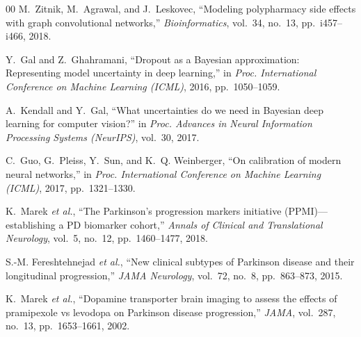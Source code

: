 \documentclass[journal,twoside,web]{ieeecolor}
\begin{document}
\begin{thebibliography}{00}
M.~Zitnik, M.~Agrawal, and J.~Leskovec, ``Modeling polypharmacy side effects with graph convolutional networks,'' \textit{Bioinformatics}, vol.~34, no.~13, pp.~i457--i466, 2018.

Y.~Gal and Z.~Ghahramani, ``Dropout as a {B}ayesian approximation: Representing model uncertainty in deep learning,'' in \textit{Proc. International Conference on Machine Learning (ICML)}, 2016, pp.~1050--1059.

A.~Kendall and Y.~Gal, ``What uncertainties do we need in {B}ayesian deep learning for computer vision?'' in \textit{Proc. Advances in Neural Information Processing Systems (NeurIPS)}, vol.~30, 2017.

C.~Guo, G.~Pleiss, Y.~Sun, and K.~Q. Weinberger, ``On calibration of modern neural networks,'' in \textit{Proc. International Conference on Machine Learning (ICML)}, 2017, pp.~1321--1330.

K.~Marek \textit{et al.}, ``The Parkinson's progression markers initiative (PPMI)---establishing a PD biomarker cohort,'' \textit{Annals of Clinical and Translational Neurology}, vol.~5, no.~12, pp.~1460--1477, 2018.

S.-M. Fereshtehnejad \textit{et al.}, ``New clinical subtypes of {P}arkinson disease and their longitudinal progression,'' \textit{JAMA Neurology}, vol.~72, no.~8, pp.~863--873, 2015.

K.~Marek \textit{et al.}, ``Dopamine transporter brain imaging to assess the effects of pramipexole vs levodopa on {P}arkinson disease progression,'' \textit{JAMA}, vol.~287, no.~13, pp.~1653--1661, 2002.

\end{thebibliography}
\end{document}
